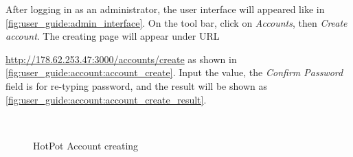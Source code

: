 After logging in as an administrator, the user interface will appeared like in \autoref{fig:user_guide:admin_interface}.
On the tool bar, click on \emph{Accounts}, then \emph{Create account}.
The creating page will appear under URL

\noindent\href{http://178.62.253.47:3000/accounts/create}{http://178.62.253.47:3000/accounts/create} as shown in \autoref{fig:user_guide:account:account_create}.
Input the value, the \emph{Confirm Password} field is for re-typing password, and the result will be shown as \autoref{fig:user_guide:account:account_create_result}.

\begin{figure}[bth]
\myfloatalign
{} \quad
{} \\
\caption[HotPot Account creation]{HotPot Account creating}
\label{fig:user_guide:account:account_create}
\end{figure}

